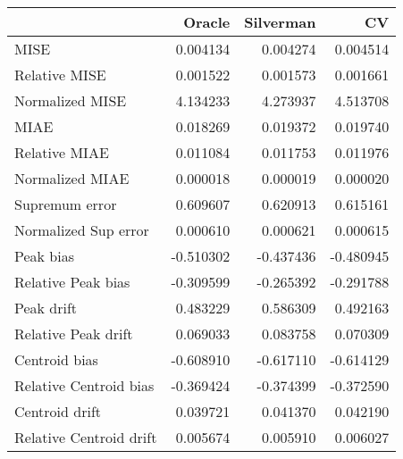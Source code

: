 \begin{tabular}{lrrr}
  \toprule
 & Oracle & Silverman & CV \\ 
  \midrule
MISE & 0.004134 & 0.004274 & 0.004514 \\ 
  Relative MISE & 0.001522 & 0.001573 & 0.001661 \\ 
  Normalized MISE & 4.134233 & 4.273937 & 4.513708 \\ 
  MIAE & 0.018269 & 0.019372 & 0.019740 \\ 
  Relative MIAE & 0.011084 & 0.011753 & 0.011976 \\ 
  Normalized MIAE & 0.000018 & 0.000019 & 0.000020 \\ 
  Supremum error & 0.609607 & 0.620913 & 0.615161 \\ 
  Normalized Sup error & 0.000610 & 0.000621 & 0.000615 \\ 
  Peak bias & -0.510302 & -0.437436 & -0.480945 \\ 
  Relative Peak bias & -0.309599 & -0.265392 & -0.291788 \\ 
  Peak drift & 0.483229 & 0.586309 & 0.492163 \\ 
  Relative Peak drift & 0.069033 & 0.083758 & 0.070309 \\ 
  Centroid bias & -0.608910 & -0.617110 & -0.614129 \\ 
  Relative Centroid bias & -0.369424 & -0.374399 & -0.372590 \\ 
  Centroid drift & 0.039721 & 0.041370 & 0.042190 \\ 
  Relative Centroid drift & 0.005674 & 0.005910 & 0.006027 \\ 
   \bottomrule
\end{tabular}
